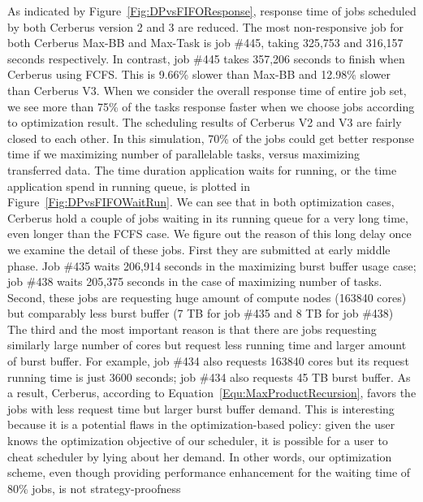 As indicated by Figure~\ref{Fig:DPvsFIFOResponse}, response time of
jobs scheduled by both Cerberus version 2 and 3 are reduced.
The most non-responsive job for both Cerberus Max-BB and Max-Task is job \#445,
taking 325,753 and 316,157 seconds respectively.
In contrast, job \#445 takes 357,206 seconds to finish when Cerberus using FCFS.
This is 9.66\% slower than Max-BB and 12.98\% slower than Cerberus V3.
When we consider the overall response time of entire job set,
we see more than 75\% of the tasks response faster when we choose jobs according to
optimization result.
The scheduling results of Cerberus V2 and V3 are fairly closed to each other.
In this simulation, 70\% of the jobs could get better response time
if we maximizing number of parallelable tasks,
versus maximizing transferred data.
The time duration application waits for running,
or the time application spend in running queue,
is plotted in Figure~\ref{Fig:DPvsFIFOWaitRun}.
We can see that in both optimization cases, Cerberus hold a couple of jobs waiting
in its running queue for a very long time,
even longer than the FCFS case.
We figure out the reason of this long delay once we examine the detail of these jobs.
First they are submitted at early middle phase.
Job \#435 waits 206,914 seconds in the maximizing burst buffer usage case;
job \#438 waits 205,375 seconds in the case of maximizing number of tasks.
Second, these jobs are requesting huge amount of compute nodes (163840 cores)
but comparably less burst buffer (7 TB for job \#435 and 8 TB for job \#438)
The third and the most important reason is that there are jobs requesting similarly
large number of cores but request less running time and larger amount of burst buffer.
For example, job \#434 also requests 163840 cores
but its request running time is just 3600 seconds;
job \#434 also requests 45 TB burst buffer.
As a result, Cerberus, according to Equation~\ref{Equ:MaxProductRecursion},
favors the jobs with less request time but larger burst buffer demand.
This is interesting because it is a potential flaws in the optimization-based policy:
given the user knows the optimization objective of our scheduler,
it is possible for a user to cheat scheduler by lying about her demand.
In other words, our optimization scheme, even though providing performance enhancement
for the waiting time of 80\% jobs, is not strategy-proofness\cite{Ghodsi:NSDI:2011}


